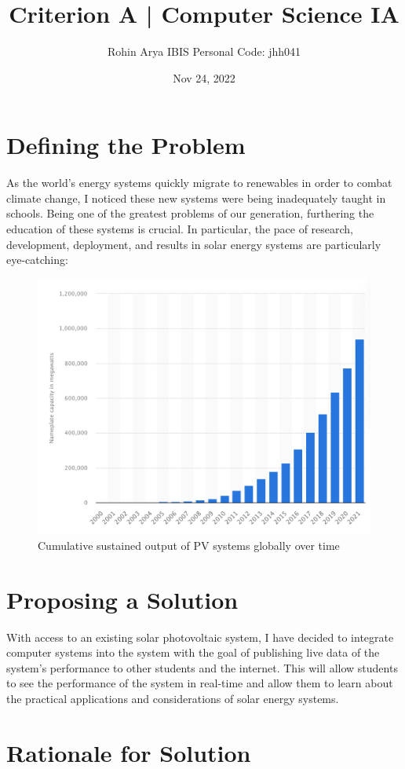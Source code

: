 \documentclass[titlepage]{article}
\title{Criterion A | Computer Science IA}
\author{Rohin Arya IBIS Personal Code: jhh041}
\date{Nov 24, 2022}
\begin{document}
\maketitle

\tableofcontents
\pagebreak

\section{Defining the Problem}
As the world's energy systems quickly migrate to renewables in order to combat climate change, I noticed these new systems were being inadequately taught in schools. Being one of the greatest problems of our generation, furthering the education of these systems is crucial. In particular, the pace of research, development, deployment, and results in solar energy systems are particularly eye-catching: 

\vspace*{5mm}

\begin{figure}[h]
  \includegraphics[width=\linewidth]{images/SCR-20221124-7e6.png}
  \caption{Cumulative sustained output of PV systems globally over time}
  \label{fig:graph}
\end{figure}

\vspace*{5mm}

\section{Proposing a Solution}
With access to an existing solar photovoltaic system, I have decided to integrate computer systems into the system with the goal of publishing live data of the system's performance to other students and the internet. This will allow students to see the performance of the system in real-time and allow them to learn about the practical applications and considerations of solar energy systems.

\section{Rationale for Solution}
\end{document}
